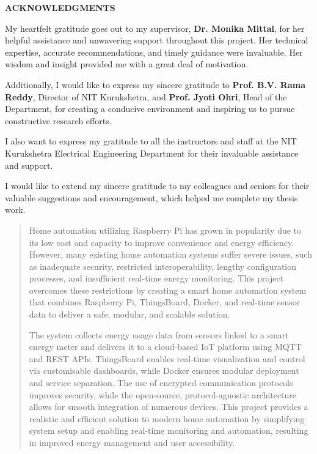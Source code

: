 \documentclass[a4paper,12pt]{report}
\begin{document}
\newpage

\begin{center}
    \textbf{\Large ACKNOWLEDGMENTS}\\
    \hrulefill
\end{center}

\vspace{0.5cm}

My heartfelt gratitude goes out to my supervisor, \textbf{Dr. Monika Mittal}, for her helpful assistance and unwavering support throughout this project. Her technical expertise, accurate recommendations, and timely guidance were invaluable. Her wisdom and insight provided me with a great deal of motivation.  

Additionally, I would like to express my sincere gratitude to \textbf{Prof. B.V. Rama Reddy}, Director of NIT Kurukshetra, and \textbf{Prof. Jyoti Ohri}, Head of the Department, for creating a conducive environment and inspiring us to pursue constructive research efforts.  

I also want to express my gratitude to all the instructors and staff at the NIT Kurukshetra Electrical Engineering Department for their invaluable assistance and support.  

I would like to extend my sincere gratitude to my colleagues and seniors for their valuable suggestions and encouragement, which helped me complete my thesis work.

\begin{abstract}
    Home automation utilizing Raspberry Pi has grown in popularity due to its low cost and capacity to improve convenience and energy efficiency.  However, many existing home automation systems suffer severe issues, such as inadequate security, restricted interoperability, lengthy configuration processes, and insufficient real-time energy monitoring.  This project overcomes these restrictions by creating a smart home automation system that combines Raspberry Pi, ThingsBoard, Docker, and real-time sensor data to deliver a safe, modular, and scalable solution.
    
    The system collects energy usage data from sensors linked to a smart energy meter and delivers it to a cloud-based IoT platform using MQTT and REST APIs.  ThingsBoard enables real-time visualization and control via customisable dashboards, while Docker ensures modular deployment and service separation.  The use of encrypted communication protocols improves security, while the open-source, protocol-agnostic architecture allows for smooth integration of numerous devices.  This project provides a realistic and efficient solution to modern home automation by simplifying system setup and enabling real-time monitoring and automation, resulting in improved energy management and user accessibility.
\end{abstract}
    
\end{document}

